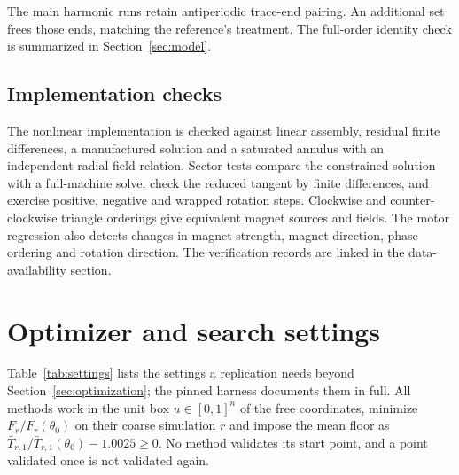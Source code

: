 \documentclass{anvil-paper}
\begin{document}
The main harmonic runs retain antiperiodic trace-end pairing. An additional
set frees those ends, matching the reference's treatment. The full-order
identity check is summarized in Section~\ref{sec:model}.

\subsection{Implementation checks}
The nonlinear implementation is checked against linear assembly, residual
finite differences, a manufactured solution and a saturated annulus with
an independent radial field relation. Sector tests compare the
constrained solution with a full-machine solve, check the reduced tangent
by finite differences, and exercise positive, negative and wrapped rotation
steps. Clockwise and counter-clockwise triangle orderings give equivalent
magnet sources and fields. The motor regression also detects changes in
magnet strength, magnet direction, phase ordering and rotation direction.
The verification records are linked in the data-availability section.

\section{Optimizer and search settings}\label{sec:settings}
Table~\ref{tab:settings} lists the settings a replication needs beyond
Section~\ref{sec:optimization}; the pinned harness documents them in full.
All methods work in the unit box $u\in[0,1]^n$ of the free coordinates,
minimize $F_r/F_r(\theta_0)$ on their coarse simulation $r$ and impose the
mean floor as $\bar T_{r,1}/\bar T_{r,1}(\theta_0)-1.0025\geq0$.
No method validates its start point, and a point validated once is not
validated again.
\end{document}
